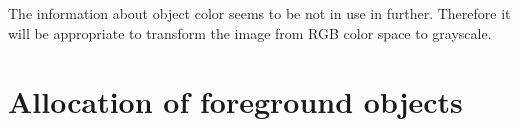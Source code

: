 \documentclass[12pt,a4paper,oneside,titlepage]{article}
\begin{document}
The information about object color seems to be not in use in further.
Therefore it will be appropriate to transform the image from RGB color space to grayscale.






























\newpage
\section*{Allocation of foreground objects}
\end{document}
